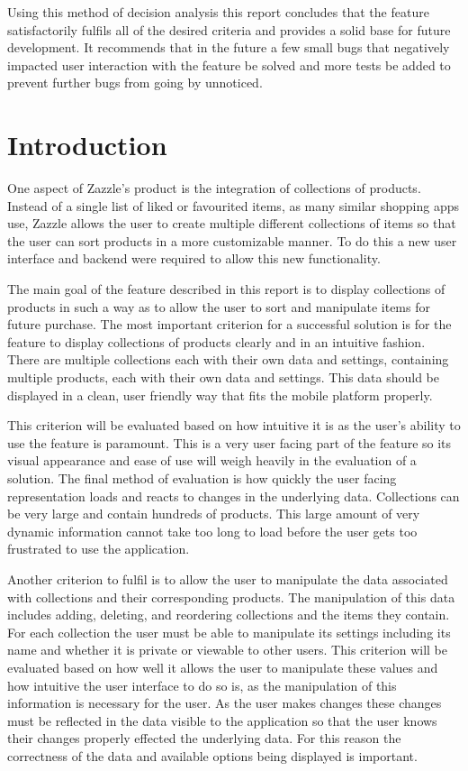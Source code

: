 \documentclass[12pt]{article}
\begin{document}
Using this method of decision analysis this report concludes that the feature satisfactorily fulfils all of the desired criteria and provides a solid base for future development. It recommends that in the future a few small bugs that negatively impacted user interaction with the feature be solved and more tests be added to prevent further bugs from going by unnoticed.

\newpage


\toc
\lot


\section{Introduction}
One aspect of Zazzle's product is the integration of collections of products. Instead of a single list of liked or favourited items, as many similar shopping apps use, Zazzle allows the user to create multiple different collections of items so that the user can sort products in a more customizable manner. To do this a new user interface and backend were required to allow this new functionality. 

The main goal of the feature described in this report is to display collections of products in such a way as to allow the user to sort and manipulate items for future purchase. The most important criterion for a successful solution is for the feature to display collections of products clearly and in an intuitive fashion. There are multiple collections each with their own data and settings, containing multiple products, each with their own data and settings. This data should be displayed in a clean, user friendly way that fits the mobile platform properly. 

This criterion will be evaluated based on how intuitive it is as the user's ability to use the feature is paramount. This is a very user facing part of the feature so its visual appearance and ease of use will weigh heavily in the evaluation of a solution. The final method of evaluation is how quickly the user facing representation loads and reacts to changes in the underlying data. Collections can be very large and contain hundreds of products. This large amount of very dynamic information cannot take too long to load before the user gets too frustrated to use the application.

Another criterion to fulfil is to allow the user to manipulate the data associated with collections and their corresponding products. The manipulation of this data includes adding, deleting, and reordering collections and the items they contain. For each collection the user must be able to manipulate its settings including its name and whether it is private or viewable to other users. This criterion will be evaluated based on how well it allows the user to manipulate these values and how intuitive the user interface to do so is, as the manipulation of this information is necessary for the user. As the user makes changes these changes must be reflected in the data visible to the application so that the user knows their changes properly effected the underlying data. For this reason the correctness of the data and available options being displayed is important.
\end{document}

